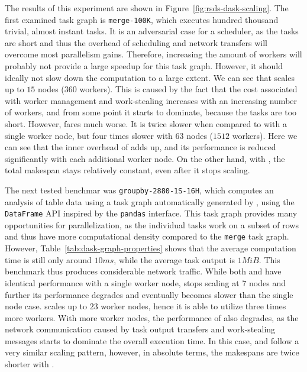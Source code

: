 The results of this experiment are shown in Figure~\ref{fig:rsds-dask-scaling}. The first examined
task graph is \texttt{merge-100K}, which executes hundred thousand trivial, almost instant
tasks. It is an adversarial case for a scheduler, as the tasks are short and thus the overhead of
scheduling and network transfers will overcome most parallelism gains. Therefore, increasing the
amount of workers will probably not provide a large speedup for this task graph. However, it should
ideally not slow down the computation to a large extent. We can see that
\rsds{} scales up to $15$ nodes
($360$ workers). This is caused by the fact that the cost associated with
worker management and work-stealing increases with an increasing number of workers, and from some
point it starts to dominate, because the tasks are too short. However, \dask{}
fares much worse. It is twice slower when compared to \rsds{} with a single
worker node, but four times slower with $63$ nodes
($1512$ workers). Here we can see that the inner overhead of
\dask{} adds up, and its performance is reduced significantly with each
additional worker node. On the other hand, with \rsds{}, the total makespan
stays relatively constant, even after it stops scaling.

The next tested benchmar was \texttt{groupby-2880-1S-16H}, which computes an analysis of table data
using a task graph automatically generated by \dask{}, using the
\texttt{DataFrame} API inspired by the \texttt{pandas} interface. This task
graph provides many opportunities for parallelization, as the individual tasks work on a subset of
rows and thus have more computational density compared to the \texttt{merge} task
graph. However, Table~\ref{tab:dask-graph-properties} shows that the average computation time is still
only around $10ms$, while the average task output is
$1 MiB$. This benchmark thus produces considerable network traffic. While both
\dask{} and \rsds{} have identical performance with a
single worker node, \dask{} stops scaling at $7$ nodes
and further its performance degrades and eventually becomes slower than the single node case.
\rsds{} scales up to $23$ worker nodes, hence it is able
to utilize three times more workers. With more worker nodes, the performance of
\rsds{} also degrades, as the network communication caused by task output
transfers and work-stealing messages starts to dominate the overall execution time. In this case,
\dask{} and \rsds{} follow a very similar scaling pattern,
however, in absolute terms, the makespans are twice shorter with \rsds{}.

